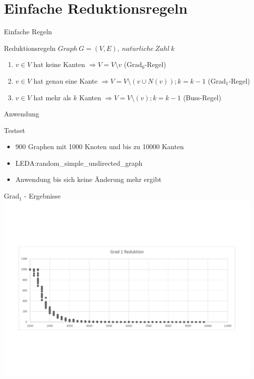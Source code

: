 \documentclass{beamer}
\begin{document}
\section{Einfache Reduktionsregeln}
\begin{frame}{Einfache Regeln}
\begin{block}{Reduktionsregeln}\pause
$Graph\ G=(V,E),\ nat\ddot{u}rliche\ Zahl\ k$\pause
\begin{enumerate}
\item $v \in V$ hat keine Kanten $\Rightarrow V = V \setminus v$ (Grad$_{0}$-Regel) \pause
\item $v \in V$ hat genau eine Kante $\Rightarrow V = V \setminus (v \cup N(v)); k = k-1 $ (Grad$_{1}$-Regel) \pause
\item $v \in V$ hat mehr als $k$ Kanten $\Rightarrow V = V \setminus (v); k = k-1 $ (Buss-Regel)

\end{enumerate}
\end{block}
\end{frame}

\begin{frame}{Anwendung}
\begin{block}{Testset}\pause
\begin{itemize}
\item 900 Graphen mit 1000 Knoten und bis zu 10000 Kanten\pause
\item LEDA:random\_simple\_undirected\_graph\pause
\item Anwendung bis sich keine Änderung mehr ergibt
\end{itemize}
\end{block}
\end{frame}


\begin{frame}{Grad$_{1}$ - Ergebnisse}
\includegraphics[scale= .4]{analysisOne.pdf} 
\end{frame}
\end{document}
